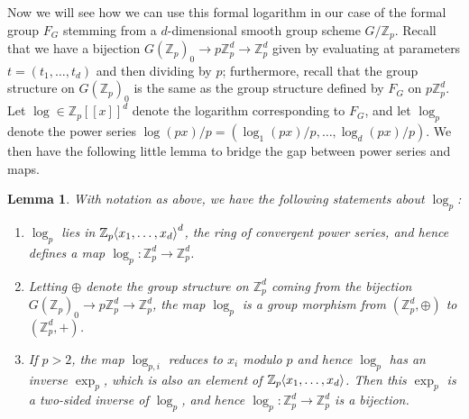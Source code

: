 \documentclass{article}
\newcommand{\Z}{\mathbb{Z}}
\renewcommand{\angle}[1]{\hspace{-2pt}\left\langle #1 \right\rangle}
\theoremstyle{plain}
\newtheorem{lem}[thm]{Lemma} %
\theoremstyle{definition}
\theoremstyle{remark}
\begin{document}
Now we will see how we can use this formal logarithm in our case of the formal group $F_G$ stemming from a $d$-dimensional smooth group scheme $G/\Z_p$. Recall that we have a bijection $G(\Z_p)_0 \to p\Z_p^d \to \Z_p^d$ given by evaluating at parameters $t = (t_1,\dots,t_d)$ and then dividing by $p$; furthermore, recall that the group structure on $G(\Z_p)_0$ is the same as the group structure defined by $F_G$ on $p\Z_p^d$. Let $\log \in \Z_p[[x]]^d$ denote the logarithm corresponding to $F_G$, and let $\log_p$ denote the power series $\log(px)/p = (\log_1(px)/p,\dots,\log_d(px)/p)$. We then have the following little lemma to bridge the gap between power series and maps.
\begin{lem}
\label{lem:formallog}
With notation as above, we have the following statements about $\log_p$:
\begin{enumerate}
	\item $\log_p$ lies in $\Z_p\angle{x_1,\dots,x_d}^d$, the ring of convergent power series, and hence defines a map $\log_p: \Z_p^d \to \Z_p^d$.
	\item Letting $\oplus$ denote the group structure on $\Z_p^d$ coming from the bijection $G(\Z_p)_0 \to p\Z_p^d \to \Z_p^d$, the map $\log_p$ is a group morphism from $(\Z_p^d,\oplus)$ to $(\Z_p^d,+)$.
	\item If $p > 2$, the map $\log_{p,i}$ reduces to $x_i$ modulo $p$ and hence $\log_p$ has an inverse $\exp_p$, which is also an element of $\Z_p\angle{x_1,\dots,x_d}$. Then this $\exp_p$ is a two-sided inverse of $\log_p$, and hence $\log_p: \Z_p^d \to \Z_p^d$ is a bijection.
\end{enumerate} 
\end{lem}
\end{document}
